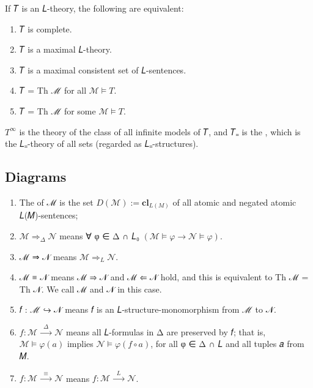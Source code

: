 \documentclass[a4paper,UKenglish,cleveref,autoref,thm-restate,12pt]{lipics-v2021-wjd}
\newcommand{\<}{\langle}
\renewcommand{\>}{\rangle}
\begin{document}
\begin{lemma} If 𝑇 is an 𝐿-theory, the
  following are equivalent:
  \begin{enumerate}
  \def\labelenumi{\arabic{enumi}.}
  \item 𝑇 is complete.
  \item 𝑇 is a maximal 𝐿-theory.
  \item 𝑇 is a maximal consistent set of 𝐿-sentences.
  \item 𝑇 = Th ℳ for all \(ℳ \models 𝑇\).
  \item 𝑇 = Th ℳ for some \(ℳ \models 𝑇\).
  \end{enumerate}
\end{lemma}

\begin{examples*}
\(T^∞\) is the theory of the class of all infinite models of 𝑇, and 𝑇₌ is the , which is the 𝐿₌-theory of all sets (regarded as 𝐿₌-structures). 
\end{examples*}
\subsection{Diagrams}\label{diagrams}
\begin{enumerate}
\item The  of ℳ is the set \(𝐷(ℳ) := \mathbf{cl}_{𝐿(𝑀)}\) of all
  atomic and negated atomic 𝐿(𝑀)-sentences;
\item
  \(ℳ ⇒_Δ 𝒩\) means ∀ φ ∈ Δ ∩ 𝐿₀ \((ℳ \models φ → 𝒩 \models φ)\).
\item
  ℳ ⇒ 𝒩 means \(ℳ ⇒_𝐿 𝒩\).
\item
  ℳ ≡ 𝒩 means ℳ ⇒ 𝒩 and ℳ ⇐ 𝒩 hold, and this is equivalent to Th ℳ = Th 𝒩.
  We call ℳ and 𝒩  in this case.
\item
  𝑓 : ℳ ↪ 𝒩 means 𝑓 is an 𝐿-structure-monomorphism from ℳ to 𝒩.
\item
  \(𝑓 : ℳ \stackrel{Δ}{⟶} 𝒩\) means all 𝐿-formulas in Δ are preserved by 𝑓; that
  is, \(ℳ \models φ(𝑎)\) implies \(𝒩 \models φ(𝑓 ∘ 𝑎)\), for all φ ∈ Δ ∩ 𝐿 and all tuples 𝑎 from 𝑀.
\item
  \(𝑓 : ℳ \stackrel{≡}{⟶} 𝒩\) means \(𝑓 : ℳ \stackrel{L}{⟶} 𝒩\).
\end{enumerate}
\end{document}
